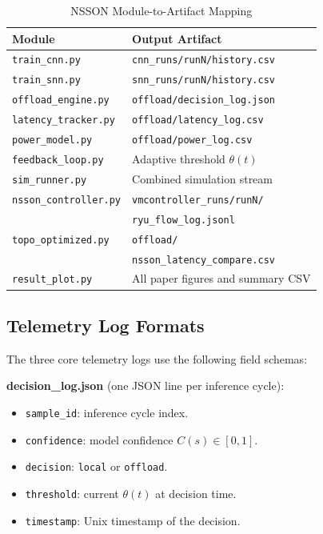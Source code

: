 \documentclass[journal]{IEEEtran}
\begin{document}
\begin{table}[!t]
\caption{NSSON Module-to-Artifact Mapping}
\label{tab:modules}
\centering
\footnotesize
\renewcommand{\arraystretch}{1.1}
\setlength{\tabcolsep}{3pt}
\begin{tabular}{p{}p{}}
\toprule
\textbf{Module} & \textbf{Output Artifact} \\
\midrule
\texttt{train\_cnn.py} & \texttt{cnn\_runs/runN/history.csv} \\
\texttt{train\_snn.py} & \texttt{snn\_runs/runN/history.csv} \\
\texttt{offload\_engine.py} & \texttt{offload/decision\_log.json} \\
\texttt{latency\_tracker.py} & \texttt{offload/latency\_log.csv} \\
\texttt{power\_model.py} & \texttt{offload/power\_log.csv} \\
\texttt{feedback\_loop.py} & Adaptive threshold $\theta(t)$ \\
\texttt{sim\_runner.py} & Combined simulation stream \\
\texttt{nsson\_controller.py} & \texttt{vmcontroller\_runs/runN/} \\
& \texttt{ryu\_flow\_log.jsonl} \\
\texttt{topo\_optimized.py} & \texttt{offload/} \\
& \texttt{nsson\_latency\_compare.csv} \\
\texttt{result\_plot.py} & All paper figures and summary CSV \\
\bottomrule
\end{tabular}
\end{table}

\subsection{Telemetry Log Formats}

The three core telemetry logs use the following field schemas:

\textbf{decision\_log.json} (one JSON line per inference cycle):
\begin{itemize}
\item \texttt{sample\_id}: inference cycle index.
\item \texttt{confidence}: model confidence $C(s) \in [0,1]$.
\item \texttt{decision}: \texttt{local} or \texttt{offload}.
\item \texttt{threshold}: current $\theta(t)$ at decision time.
\item \texttt{timestamp}: Unix timestamp of the decision.
\end{itemize}
\end{document}
